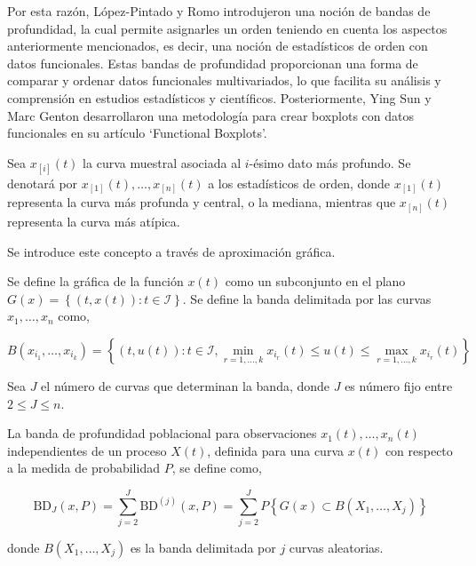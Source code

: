 Por esta razón, López-Pintado y Romo introdujeron una noción de bandas de profundidad, la cual permite asignarles un orden teniendo en cuenta los aspectos anteriormente mencionados, es decir, una noción de estadísticos de orden con datos funcionales. Estas bandas de profundidad proporcionan una forma de comparar y ordenar datos funcionales multivariados, lo que facilita su análisis y comprensión en estudios estadísticos y científicos. Posteriormente, Ying Sun y Marc Genton desarrollaron una metodología para crear boxplots con datos funcionales en su artículo `Functional Boxplots'. \cite{boxplotFun}

Sea $x_{[i]}(t)$ la curva muestral asociada al $i$-ésimo dato más profundo. Se denotará por $x_{[1]}(t), \dots, x_{[n]}(t)$ a los estadísticos de orden, donde $x_{[1]}(t)$ representa la curva más profunda y central, o la mediana, mientras que $x_{[n]}(t)$ representa la curva más atípica.

Se introduce este concepto a través de aproximación gráfica.

\begin{defn}[Banda]
    Se define la gráfica de la función $x(t)$ como un subconjunto en el plano $G(x) =  \left\{ (t, x(t)): t \in \mathcal{I} \right\}$. Se define la banda delimitada por las curvas $x_1, \dots, x_n$ como,
    
    \begin{equation}
        B\left(x_{i_1}, \ldots, x_{i_k}\right)=\left\{(t, u(t)): t \in \mathcal{I}, \min_{r=1, \ldots, k} x_{i_r}(t) \leq u(t) \leq \max _{r=1, \ldots, k} x_{i_r}(t)\right\}
    \end{equation}
\end{defn}

\begin{defn}
    Sea $J$ el número de curvas que determinan la banda, donde $J$ es número fijo entre $2 \leq J \leq n$.

    La banda de profundidad poblacional para observaciones $x_1(t), \dots, x_n(t)$ independientes de un proceso $X(t)$, definida para una curva $x(t)$ con respecto a la medida de probabilidad $P$, se define como,

    \begin{equation}
        \mathrm{BD}_J(x, P)=\sum_{j=2}^J \mathrm{BD}^{(j)}(x, P)=\sum_{j=2}^J P\left\{G(x) \subset B\left(X_1, \ldots, X_j\right)\right\}
    \end{equation}

    donde $B(X_1, \dots, X_j)$ es la banda delimitada por $j$ curvas aleatorias.
\end{defn}

